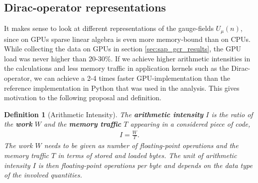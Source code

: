 \documentclass{article}
\theoremstyle{plain} %
\newtheorem{definition}{Definition}[section]
\theoremstyle{convention} %
\theoremstyle{remark} %
\def\df#1{\textbf{\textit{#1}}}
\numberwithin{equation}{section}
\begin{document}

\subsection{Dirac-operator representations}

It makes sense to look at different representations of the gauge-fields $U_{\mu}(n)$, since on GPUs sparse linear algebra is even more memory-bound than on CPUs. While collecting the data on GPUs in section \ref{sec:sap_gcr_results}, the GPU load was never higher than \num{20}-\num{30}\%. If we achieve higher arithmetic intensities in the calculations and less memory traffic in application kernels such as the Dirac-operator, we can achieve a \num{2}-\num{4} times faster GPU-implementation than the reference implementation in Python that was used in the analysis. This gives motivation to the following proposal and definition.

\begin{definition}[Arithmetic Intensity]
  The \df{arithmetic intensity} $I$ is the ratio of the \df{work} $W$ and the \df{memory traffic} $T$ appearing in a considered piece of code,
  \begin{align*}
    I = \frac{W}{T}.
  \end{align*}
  The work $W$ needs to be given as number of floating-point operations and the memory traffic $T$ in terms of stored and loaded bytes. The unit of arithmetic intensity $I$ is then floating-point operations per byte and depends on the data type of the involved quantities.
\end{definition}
\end{document}
